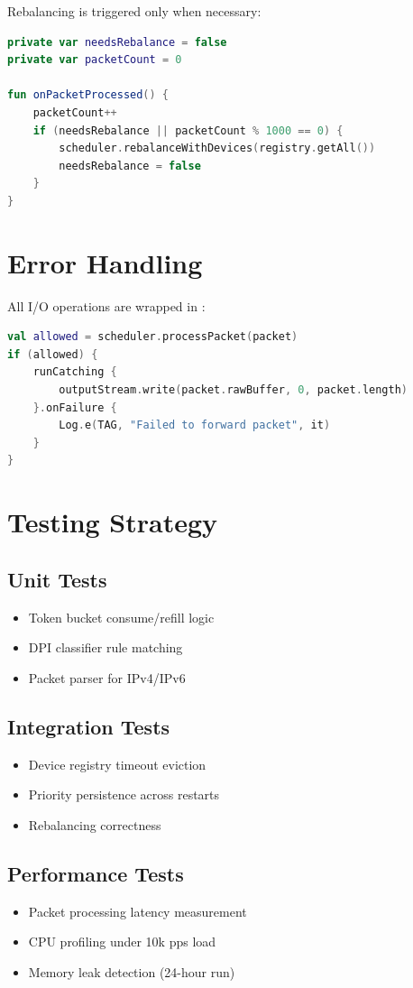 Rebalancing is triggered only when necessary:

\begin{lstlisting}[language=Kotlin, caption={Conditional Rebalancing}]
private var needsRebalance = false
private var packetCount = 0

fun onPacketProcessed() {
    packetCount++
    if (needsRebalance || packetCount % 1000 == 0) {
        scheduler.rebalanceWithDevices(registry.getAll())
        needsRebalance = false
    }
}
\end{lstlisting}

\section{Error Handling}

All I/O operations are wrapped in :

\begin{lstlisting}[language=Kotlin, caption={Safe Packet Forwarding}]
val allowed = scheduler.processPacket(packet)
if (allowed) {
    runCatching { 
        outputStream.write(packet.rawBuffer, 0, packet.length) 
    }.onFailure { 
        Log.e(TAG, "Failed to forward packet", it) 
    }
}
\end{lstlisting}

\section{Testing Strategy}

\subsection{Unit Tests}

\begin{itemize}
    \item Token bucket consume/refill logic
    \item DPI classifier rule matching
    \item Packet parser for IPv4/IPv6
\end{itemize}

\subsection{Integration Tests}

\begin{itemize}
    \item Device registry timeout eviction
    \item Priority persistence across restarts
    \item Rebalancing correctness
\end{itemize}

\subsection{Performance Tests}

\begin{itemize}
    \item Packet processing latency measurement
    \item CPU profiling under 10k pps load
    \item Memory leak detection (24-hour run)
\end{itemize}
